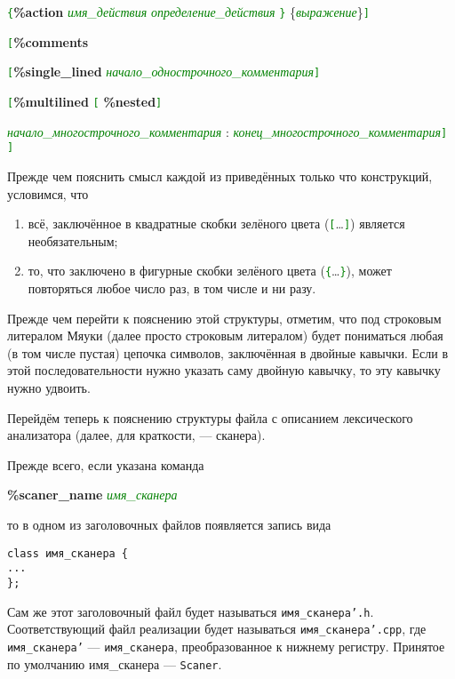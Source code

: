 \documentclass[10pt]{report}
\begin{document}
\texttt{\textcolor{Green}{\{}}\textbf{\%action} \textcolor{Green}{\textit{имя_действия}} \textcolor{Green}{\textit{определение_действия}} \texttt{\textcolor{Green}{\}}}
\{\textcolor{Green}{\textit{выражение}}\}\texttt{\textcolor{Green}{]}}

\noindent%
\texttt{\textcolor{Green}{[}}\textbf{\%comments}

\texttt{\textcolor{Green}{[}}\textbf{\%single_lined} \textcolor{Green}{\textit{начало_однострочного_комментария}}\texttt{\textcolor{Green}{]}}

\texttt{\textcolor{Green}{[}}\textbf{\%multilined} \texttt{\textcolor{Green}{[}}%
\textbf{\%nested}\texttt{\textcolor{Green}{]}}

\textcolor{Green}{\textit{начало_многострочного_комментария}} :
\textcolor{Green}{\textit{конец_многострочного_комментария}}\texttt{\textcolor{Green}{]}}%
\textcolor{Green}{\texttt{]}}

Прежде чем пояснить смысл каждой из приведённых только что конструкций, условимся, что
\begin{enumerate}
\item всё, заключённое в квадратные скобки зелёного цвета  (\texttt{\textcolor{Green}{[}}\dots\texttt{\textcolor{Green}{]}}) является необязательным;
\item то, что заключено в фигурные скобки зелёного цвета  (\texttt{\textcolor{Green}{\{}}\dots\texttt{\textcolor{Green}{\}}}), может повторяться любое число раз, в том числе и ни разу. 
\end{enumerate}

Прежде чем перейти к пояснению этой структуры, отметим, что под строковым литералом Мяуки (далее просто строковым литералом) будет пониматься любая (в том числе пустая) цепочка
символов, заключённая в двойные кавычки. Если в этой последовательности нужно указать саму двойную кавычку, то эту кавычку нужно удвоить.

Перейдём теперь к пояснению структуры файла с описанием лексического анализатора (далее, для краткости, --- сканера).

Прежде всего, если указана команда

{\noindent%
\textbf{\%scaner_name} \textcolor{Green}{\textit{имя_сканера}}
}

\noindent%
то в одном из заголовочных файлов появляется запись вида
\begin{verbatim}
class имя_сканера {
...
};
\end{verbatim}
Сам же этот заголовочный файл будет называться \texttt{имя_сканера'.h}. Соответствующий файл реализации будет называться \texttt{имя_сканера'.cpp}, где \texttt{имя_сканера'} --- \texttt{имя_сканера}, преобразованное к нижнему регистру. Принятое по умолчанию имя_сканера --- \texttt{Scaner}.
\end{document}
